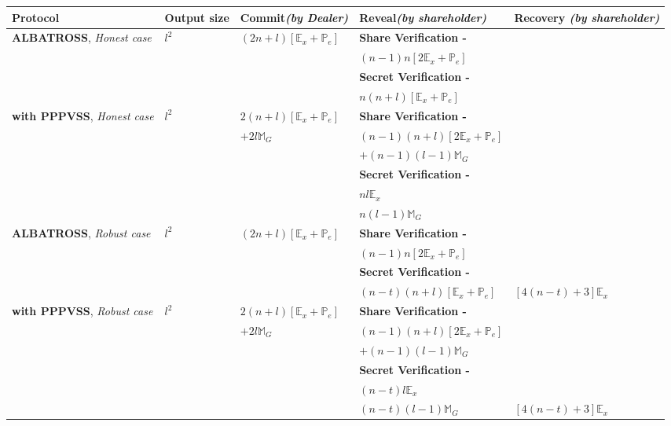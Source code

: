 \begin{table}[H]
\centering
\begin{tabular}{|p{3cm}|p{1.2cm}|p{2.5cm}|p{5.5cm}|p{2.5cm}|}
\hline
\textbf{Protocol}    & \textbf{Output size}    & 
\textbf{Commit}\textit{(by Dealer)} & \textbf{Reveal}\textit{(by 
shareholder)} & \textbf{Recovery} \textit{(by shareholder)}                                                           
\\ \hline
\textbf{ALBATROSS}, \textit{Honest case}    & $l^2$ & 
$(2n+l)[\mathbb{E}_x+\mathbb{P}_e]$ & \textbf{Share Verification - }  &  
\\
& & & $(n-1)n[2\mathbb{E}_x+\mathbb{P}_e]$ & \\
& & & \textbf{Secret Verification - } & \\ 
& & & $n(n+l)[\mathbb{E}_x+\mathbb{P}_e]$& \\ \hline
\textbf{with PPPVSS}, \textit{Honest case}    & $l^2$  & 
$2(n+l)[\mathbb{E}_x+\mathbb{P}_e]$ & \textbf{Share Verification - } &  \\ 
& & $+2l\mathbb{M}_G$ & $(n-1)(n+l)[2\mathbb{E}_x+\mathbb{P}_e]$ &  \\ 
& & & $+(n-1)(l-1)\mathbb{M}_G$ &  \\
& & & \textbf{Secret Verification - } & \\ 
& & & $nl\mathbb{E}_x$ &   \\
& & & $n(l-1)\mathbb{M}_G$ &  \\ \hline
\textbf{ALBATROSS}, \textit{Robust case}    & $l^2$ & 
$(2n+l)[\mathbb{E}_x+\mathbb{P}_e]$ & \textbf{Share Verification - }  &  
\\
& & & $(n-1)n[2\mathbb{E}_x+\mathbb{P}_e]$ & \\
& & & \textbf{Secret Verification - } & \\ 
& & & $(n-t)(n+l)[\mathbb{E}_x+\mathbb{P}_e]$& 
$[4(n-t)+3]\mathbb{E}_{x}$\\ \hline
\textbf{with PPPVSS}, \textit{Robust case}    & $l^2$  & 
$2(n+l)[\mathbb{E}_x+\mathbb{P}_e]$ & \textbf{Share Verification - } &  \\ 
& & $+2l\mathbb{M}_G$ & $(n-1)(n+l)[2\mathbb{E}_x+\mathbb{P}_e]$ &  \\ 
& & & $+(n-1)(l-1)\mathbb{M}_G$ &  \\
& & & \textbf{Secret Verification - } & \\ 
& & & $(n-t)l\mathbb{E}_x$ &   \\
& & & $(n-t)(l-1)\mathbb{M}_G$ & $[4(n-t)+3]\mathbb{E}_{x}$  \\ \hline


\end{tabular}
\end{table}
